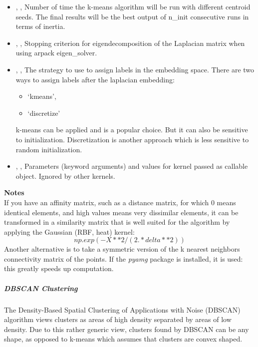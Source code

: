 \begin{itemize}
{	 or None, optional field}, A pseudo random number generator used for the
	initialization of the lobpcg eigen vectors decomposition when $eigen_solver == ‘amg’$
	 and by the K-Means initialization. 
	\item {}, , Number of time the
	 k-means algorithm will be run with different centroid seeds. The final results
	 will be the best output of n\_init consecutive runs in terms of inertia.
	\item {}, , Stopping criterion
	 for eigendecomposition of the Laplacian matrix when using arpack eigen\_solver.
	\item {}, , The strategy to
	use to assign labels in the embedding space. There are two ways to assign labels
	after the laplacian embedding:
	\begin{itemize}
		\item ‘kmeans’,
		\item ‘discretize’
	\end{itemize}
	 k-means can be applied and is a popular choice. But it can also be sensitive
	to initialization. Discretization is another approach which is less sensitive
	 to random initialization. 
	\item {}, , Parameters (keyword arguments) and values for kernel passed as
	callable object. Ignored by other kernels. 
\end{itemize}

\textbf{Notes} \\
If you have an affinity matrix, such as a distance matrix, for which 0 means identical
elements, and high values means very dissimilar elements, it can be transformed in a
similarity matrix that is well suited for the algorithm by applying the Gaussian
 (RBF, heat) kernel:
\begin{equation}
np.exp(- X ** 2 / (2. * delta ** 2))
\end{equation}
Another alternative is to take a symmetric version of the k nearest neighbors
connectivity matrix of the points.
If the \textit{pyamg} package is installed, it is used: this greatly speeds
up computation.

\subparagraph{ DBSCAN Clustering } \hfill
\label{subparagraph:DBSCAN}

The Density-Based Spatial Clustering of Applications with Noise (DBSCAN)
 algorithm views clusters as areas of high density separated by
areas of low density. Due to this rather generic view, clusters found by
DBSCAN can be any shape, as opposed to k-means which assumes that clusters
 are convex shaped.

